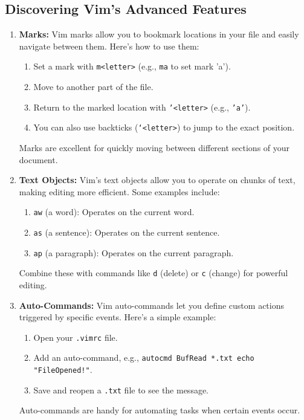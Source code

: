 \documentclass[12pt]{article}
\begin{document}
\subsection{Discovering Vim's Advanced Features}
\begin{enumerate}[label=\arabic*.]
    \item \textbf{Marks:} Vim marks allow you to bookmark locations in your file and easily navigate between them. Here's how to use them:
        \begin{enumerate}
            \item Set a mark with \texttt{m<letter>} (e.g., \texttt{ma} to set mark 'a').
            \item Move to another part of the file.
            \item Return to the marked location with \texttt{'<letter>} (e.g., \texttt{'a'}).
            \item You can also use backticks (\texttt{`<letter>}) to jump to the exact position.
        \end{enumerate}
        Marks are excellent for quickly moving between different sections of your document.

    \item \textbf{Text Objects:} Vim's text objects allow you to operate on chunks of text, making editing more efficient. Some examples include:
        \begin{enumerate}
            \item \texttt{aw} (a word): Operates on the current word.
            \item \texttt{as} (a sentence): Operates on the current sentence.
            \item \texttt{ap} (a paragraph): Operates on the current paragraph.
        \end{enumerate}
        Combine these with commands like \texttt{d} (delete) or \texttt{c} (change) for powerful editing.

    \item \textbf{Auto-Commands:} Vim auto-commands let you define custom actions triggered by specific events. Here's a simple example:
        \begin{enumerate}
            \item Open your \texttt{.vimrc} file.
            \item Add an auto-command, e.g., \texttt{autocmd BufRead *.txt echo "FileOpened!"}.
            \item Save and reopen a \texttt{.txt} file to see the message.
        \end{enumerate}
        Auto-commands are handy for automating tasks when certain events occur.
\end{enumerate}
\end{document}
